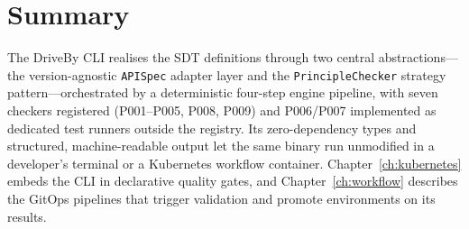 \section{Summary}
\label{sec:architecture-summary}

The DriveBy CLI realises the SDT definitions through two central abstractions---the version-agnostic \texttt{APISpec} adapter layer and the \texttt{PrincipleChecker} strategy pattern---orchestrated by a deterministic four-step engine pipeline, with seven checkers registered (P001--P005, P008, P009) and P006/P007 implemented as dedicated test runners outside the registry. Its zero-dependency types and structured, machine-readable output let the same binary run unmodified in a developer's terminal or a Kubernetes workflow container. Chapter~\ref{ch:kubernetes} embeds the CLI in declarative quality gates, and Chapter~\ref{ch:workflow} describes the GitOps pipelines that trigger validation and promote environments on its results.
